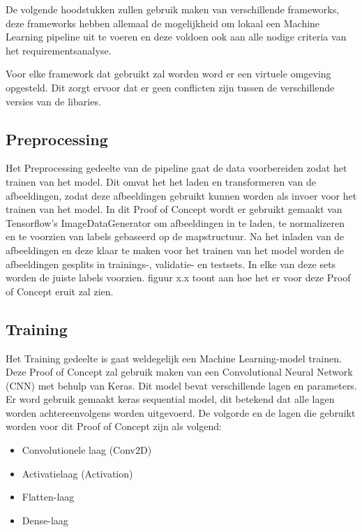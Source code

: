 
De volgende hoodstukken zullen gebruik maken van verschillende frameworks, deze frameworks hebben allemaal de mogelijkheid om lokaal een Machine Learning pipeline uit te voeren en deze voldoen ook aan alle nodige criteria van het requirementsanalyse.

Voor elke framework dat gebruikt zal worden word er een virtuele omgeving opgesteld. Dit zorgt ervoor dat er geen conflicten zijn tussen de verschillende versies van de libaries.

\subsection{Preprocessing}
Het Preprocessing gedeelte van de pipeline gaat de data voorbereiden zodat het trainen van het model. Dit omvat het het laden en transformeren van de afbeeldingen, zodat deze afbeeldingen gebruikt kunnen worden als invoer voor het trainen van het model. In dit Proof of Concept wordt er gebruikt gemaakt van Tensorflow's ImageDataGenerator om afbeeldingen in te laden, te normalizeren en te voorzien van labels gebaseerd op de mapstructuur. Na het inladen van de afbeeldingen en deze klaar te maken voor het trainen van het model worden de afbeeldingen gesplits in trainings-, validatie- en testsets. In elke van deze sets worden de juiste labels voorzien. figuur x.x toont aan hoe het er voor deze Proof of Concept eruit zal zien. 
\subsection{Training}
Het Training gedeelte is gaat weldegelijk een Machine Learning-model trainen. Deze Proof of Concept zal gebruik maken van een Convolutional Neural Network (CNN) met behulp van Keras. Dit model bevat verschillende lagen en parameters.
Er word gebruik gemaakt keras sequential model, dit betekend dat alle lagen worden achtereenvolgens worden uitgevoerd. De volgorde en de lagen die gebruikt worden voor dit Proof of Concept zijn als volgend:
\begin{itemize}
    \item Convolutionele laag (Conv2D)
    \item Activatielaag (Activation)
    \item Flatten-laag
    \item Dense-laag
\end{itemize}
